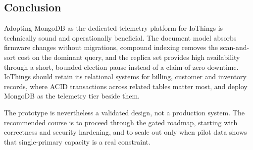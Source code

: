 \documentclass[11pt,a4paper]{article}
\begin{document}
\subsection{Conclusion}
Adopting MongoDB as the dedicated telemetry platform for IoThings is technically sound and operationally beneficial. The document model absorbs firmware changes without migrations, compound indexing removes the scan-and-sort cost on the dominant query, and the replica set provides high availability through a short, bounded election pause instead of a claim of zero downtime. IoThings should retain its relational systems for billing, customer and inventory records, where ACID transactions across related tables matter most, and deploy MongoDB as the telemetry tier beside them.

The prototype is nevertheless a validated design, not a production system. The recommended course is to proceed through the gated roadmap, starting with correctness and security hardening, and to scale out only when pilot data shows that single-primary capacity is a real constraint.
\end{document}

